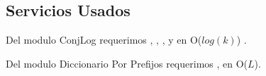 
\subsection{Servicios Usados}
Del modulo ConjLog requerimos , , ,  y  en O($log(k)$) .

Del modulo Diccionario Por Prefijos requerimos ,  en O($L$).

